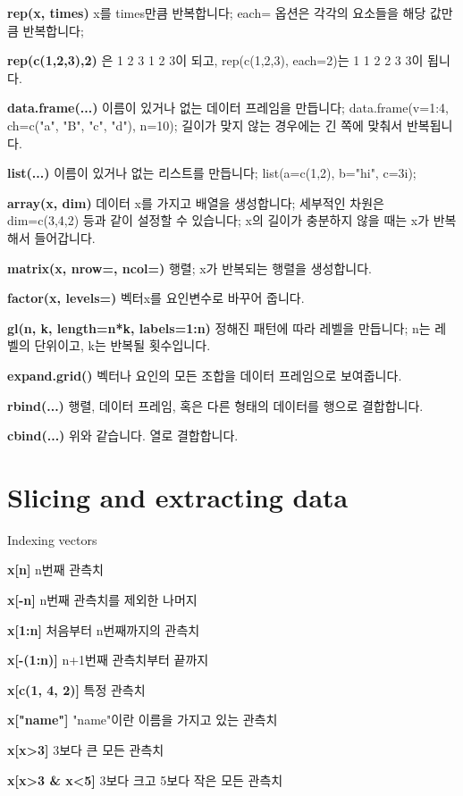 \documentclass[landscape,twocolumn,letterpaper]{article}
\begin{document}
\textbf{rep(x, times)} x를 times만큼 반복합니다; each= 옵션은 각각의 요소들을 해당 값만큼 반복합니다;

\textbf{rep(c(1,2,3),2)} 은 1 2 3 1 2 3이 되고, rep(c(1,2,3), each=2)는 1 1 2 2 3 3이
됩니다.

\textbf{data.frame(...)} 이름이 있거나 없는 데이터 프레임을 만듭니다;
	data.frame(v=1:4, ch=c("a", "B", "c", "d"), n=10);
	길이가 맞지 않는 경우에는 긴 쪽에 맞춰서 반복됩니다.

\textbf{list(...)} 이름이 있거나 없는 리스트를 만듭니다;
	list(a=c(1,2), b="hi", c=3i);

\textbf{array(x, dim)} 데이터 x를 가지고 배열을 생성합니다;
	세부적인 차원은 dim=c(3,4,2) 등과 같이 설정할 수 있습니다;
	x의 길이가 충분하지 않을 때는 x가 반복해서 들어갑니다.

\textbf{matrix(x, nrow=, ncol=)} 행렬; x가 반복되는 행렬을 생성합니다.

\textbf{factor(x, levels=)} 벡터x를 요인변수로 바꾸어 줍니다.

\textbf{gl(n, k, length=n*k, labels=1:n)} 정해진 패턴에 따라 레벨을 만듭니다;
	n는 레벨의 단위이고, k는 반복될 횟수입니다.

\textbf{expand.grid()} 벡터나 요인의 모든 조합을 데이터 프레임으로 보여줍니다.

\textbf{rbind(...)}  행렬, 데이터 프레임, 혹은 다른 형태의 데이터를 행으로 결합합니다.

\textbf{cbind(...)} 위와 같습니다. 열로 결합합니다.


\section{Slicing and extracting data}

Indexing vectors

\textbf{x[n]} n번째 관측치

\textbf{x[-n]} n번째 관측치를 제외한 나머지

\textbf{x[1:n]} 처음부터 n번째까지의 관측치

\textbf{x[-(1:n)]} n+1번째 관측치부터 끝까지

\textbf{x[c(1, 4, 2)]} 특정 관측치

\textbf{x["name"]} "name"이란 이름을 가지고 있는 관측치

\textbf{x[x>3]} 3보다 큰 모든 관측치

\textbf{x[x>3 \& x<5]} 3보다 크고 5보다 작은 모든 관측치

\end{document}
